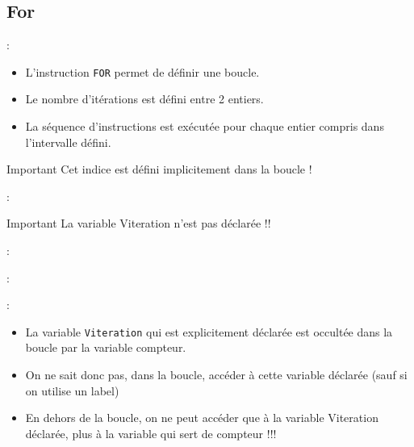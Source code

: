 \documentclass[10pt]{beamer}
\begin{document}
\subsection{For}
\begin{frame}{\secname : \subsecname}
    \begin{itemize}
        \item L'instruction \lstinline[language=plsql]!FOR! permet de définir une boucle.
        \item Le nombre d'itérations est défini entre 2 entiers.
        \item La séquence d'instructions est exécutée pour chaque entier compris dans l'intervalle défini.
    \end{itemize}
    \begin{alertblock}{Important}
        Cet indice est défini implicitement dans la boucle !
    \end{alertblock}
\end{frame}

\begin{frame}{\secname : \subsecname}
    
    \begin{alertblock}{Important}
        La variable Viteration n'est pas déclarée !!
    \end{alertblock}
\end{frame}

\begin{frame}{\secname : \subsecname}
    
\end{frame}

\begin{frame}{\secname : \subsecname}
    
\end{frame}

\begin{frame}{\secname : \subsecname}
    \begin{itemize}
        \item La variable \lstinline[language=plsql]!Viteration! qui est explicitement déclarée est occultée dans la boucle par la variable compteur.
        \item On ne sait donc pas, dans la boucle, accéder à cette variable déclarée (sauf si on utilise un label)
        \item En dehors de la boucle, on ne peut accéder que à la variable Viteration déclarée, plus à la variable qui sert de compteur !!!
    \end{itemize}
\end{frame}
\end{document}
